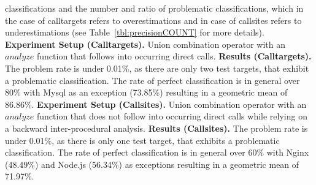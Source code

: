 classifications and the number and ratio of problematic classifications, which in the case of calltargets refers to overestimations and in case of callsites refers to underestimations 
(see Table~\ref{tbl:precisionCOUNT} for more details).
\textbf{Experiment Setup (Calltargets).} Union combination operator with an $analyze$ function that follows into occurring direct calls.
\textbf{Results (Calltargets).} The problem rate is under 0.01\%, as there are only two test targets, that exhibit a problematic classification. 
The rate of perfect classification is in general over 80\% with Mysql as an exception (73.85\%) resulting in a geometric mean of 86.86\%.
\textbf{Experiment Setup (Callsites).} Union combination operator with an $analyze$ function that does not follow into occurring direct calls while relying on a backward inter-procedural analysis.
\textbf{Results (Callsites).} The problem rate is under 0.01\%, as there is only one test target, that exhibits a problematic classification. The rate of perfect classification is in 
general over 60\% with Nginx (48.49\%) 
and Node.js (56.34\%) as exceptions resulting in a geometric mean of 71.97\%.


